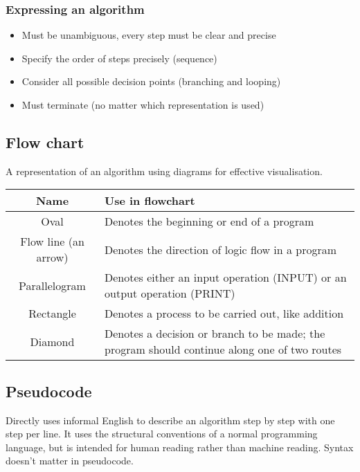 \documentclass[11pt]{article}
\begin{document}
\subsubsection{Expressing an algorithm}
\label{sec:org444cd62}
\begin{itemize}
\item Must be unambiguous, every step must be clear and precise
\item Specify the order of steps precisely (sequence)
\item Consider all possible decision points (branching and looping)
\item Must terminate (no matter which representation is used)
\end{itemize}

 \newpage

\subsection{Flow chart}
\label{sec:org6e1a9f5}
A representation of an algorithm using diagrams for effective visualisation.

\begin{center}
\begin{tabular}{|c|m{22em}|}
\hline
\textbf{Name} & \textbf{Use in flowchart}\\[0pt]
\hline
Oval & Denotes the beginning or end of a program\\[0pt]
\hline
Flow line (an arrow) & Denotes the direction of logic flow in a program\\[0pt]
\hline
Parallelogram & Denotes either an input operation (INPUT) or an output operation (PRINT)\\[0pt]
\hline
Rectangle & Denotes a process to be carried out, like addition\\[0pt]
\hline
Diamond & Denotes a decision or branch to be made; the program should continue along one of two routes\\[0pt]
\hline
\end{tabular}
\end{center}

\subsection{Pseudocode}
\label{sec:org66235ad}
Directly uses informal English to describe an algorithm step by step with one step per line. It uses the structural conventions of a normal programming language, but is intended for human reading rather than machine reading. Syntax doesn't matter in pseudocode.
\end{document}
